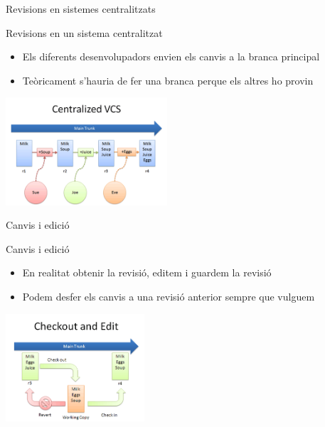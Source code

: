 \documentclass[10pt,xcolor={rgb}]{beamer}
\begin{document}
    \begin{frame}[fragile]{Revisions en sistemes centralitzats}
      
            \begin{block}{Revisions en un sistema centralitzat}
      
              \begin{itemize}
                \item Els diferents desenvolupadors envien els canvis a la branca principal
                \item Teòricament s'hauria de fer una branca perque els altres ho provin
              \end{itemize}

              \centering
              \includegraphics[height=4cm]{centralized_example.png}
      
            \end{block}
      
    \end{frame}

    \begin{frame}[fragile]{Canvis i edició}
      
            \begin{block}{Canvis i edició}
      
              \begin{itemize}
                \item En realitat obtenir la revisió, editem i guardem la revisió
                \item Podem desfer els canvis a una revisió anterior sempre que vulguem
              \end{itemize}

              \centering
              \includegraphics[height=4cm]{checkout_edit.png}
      
            \end{block}
      
    \end{frame}
\end{document}

